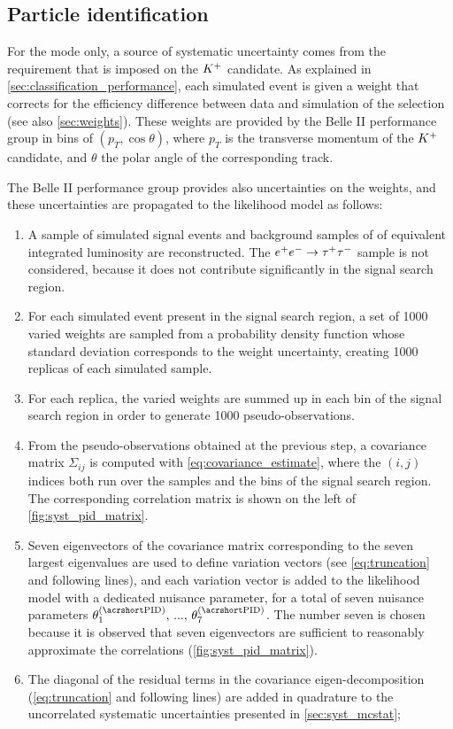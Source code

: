 \subsection{Particle identification} \label{sec:syst_pid}
For the \BKpnn mode only, a source of systematic uncertainty comes from the \PID requirement that is imposed on the $K^+$ candidate.
As explained in \cref{sec:classification_performance}, each simulated event is given a weight that corrects for the efficiency difference between data and simulation of the \PID selection (see also \cref{sec:weights}).
These \PID weights are provided by the Belle II performance group in bins of $(p_T,\cos\theta)$, where $p_T$ is the transverse momentum of the $K^+$ candidate, and $\theta$ the polar angle of the corresponding track.

The Belle II performance group provides also uncertainties on the \PID weights, and these uncertainties are propagated to the likelihood model as follows:
\begin{enumerate}
\item A sample of \nsignalmctest simulated signal events and background samples of \lumimctest of equivalent integrated luminosity are reconstructed.
The $e^+e^-\rightarrow\tau^+\tau^-$ sample is not considered, because it does not contribute significantly in the signal search region.
\item For each simulated event present in the signal search region, a set of 1000 varied \PID weights are sampled from a probability density function whose standard deviation corresponds to the \PID weight uncertainty, creating 1000 replicas of each simulated sample.
\item For each replica, the varied weights are summed up in each bin of the signal search region in order to generate 1000 pseudo-observations.
\item From the pseudo-observations obtained at the previous step, a covariance matrix $\Sigma_{ij}$ is computed with \cref{eq:covariance_estimate}, where the $(i,j)$ indices both run over the samples and the bins of the signal search region.
The corresponding correlation matrix is shown on the left of \cref{fig:syst_pid_matrix}.
\item Seven eigenvectors of the covariance matrix corresponding to the seven largest eigenvalues are used to define variation vectors (see \cref{eq:truncation} and following lines), and each variation vector is added to the likelihood model with a dedicated nuisance parameter, for a total of seven nuisance parameters $\theta_1^{(\mathrm{\PID})},\,...,\,\theta_7^{(\mathrm{\PID})}$.
The number seven is chosen because it is observed that seven eigenvectors are sufficient to reasonably approximate the correlations (\cref{fig:syst_pid_matrix}).
\item The diagonal of the residual terms in the covariance eigen-decomposition (\cref{eq:truncation} and following lines) are added in quadrature to the uncorrelated systematic uncertainties presented in \cref{sec:syst_mcstat};
\end{enumerate}

